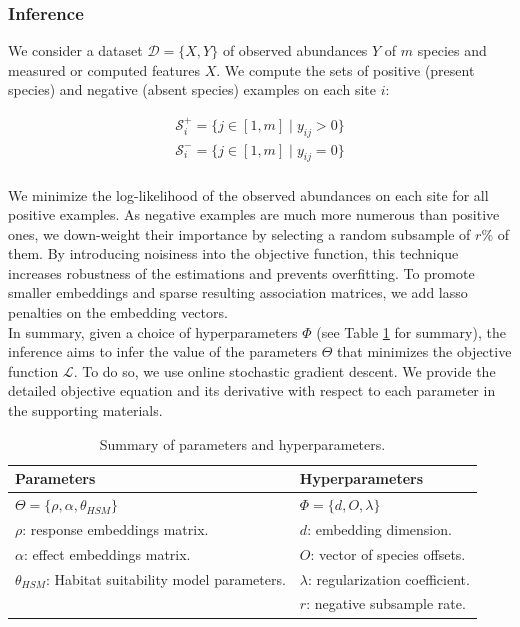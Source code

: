 \documentclass[]{article}
\begin{document}
\subsubsection{Inference}
We consider a dataset $\mathcal{D}=\{X,Y\}$ of observed abundances $Y$ of $m$ species and measured or computed features $X$. We compute the sets of positive (present species) and negative (absent species) examples on each site $i$:

\begin{equation*}
\begin{matrix}
\mathcal{S}_i^+ = \{j \in [1,m] \mid y_{ij}>0\} \\ 
\mathcal{S}_i^- = \{j \in [1,m] \mid y_{ij}=0\} \\ 
\end{matrix}
\end{equation*}

\noindent We minimize the log-likelihood of the observed abundances on each site for all positive examples. As negative examples are much more numerous than positive ones, we down-weight their importance by selecting a random subsample of $r \%$ of them. By introducing noisiness into the objective function, this technique increases robustness of the estimations and prevents overfitting. To promote smaller embeddings and sparse resulting association matrices, we add lasso penalties on the embedding vectors. \\

\noindent In summary, given a choice of hyperparameters $\Phi$ (see Table \ref{paramlist} for summary), the inference aims to infer the value of the parameters $\Theta$ that minimizes the objective function $\mathcal{L}$. To do so, we use online stochastic gradient descent. We provide the detailed objective equation and its derivative with respect to each parameter in the supporting materials. 

\begin{table}
\begin{tabular}{|l|l|}
	\hline 
	Parameters & Hyperparameters \\ 
	\hline 
	$\Theta=\{\rho,\alpha,\theta_{HSM}\}$ & $\Phi = \{ d, O, \lambda \}$ \\
	\hline
	$\rho $: response embeddings matrix. & $d$: embedding dimension. \\
	$\alpha $: effect embeddings matrix. & $O$: vector of species offsets. \\
	$\theta_{HSM} $: Habitat suitability model parameters. & $\lambda$: regularization coefficient. \\
	\textbf{ } & $r$: negative subsample rate. \\	
	\hline 
\end{tabular} 
\caption{Summary of parameters and hyperparameters.}\label{paramlist}
\end{table}   
\end{document}
